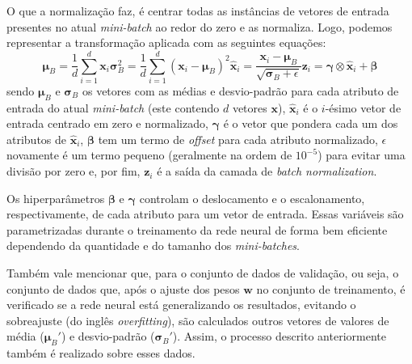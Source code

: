 \documentclass[a4paper, 12pt]{article}
\begin{document}
O que a normalização faz, é centrar todas as instâncias de vetores de entrada presentes no atual \textit{mini-batch} ao redor do zero e as normaliza. Logo, podemos representar a transformação aplicada com as seguintes equações:
\begin{subequations}
\begin{equation}\label{eq:bn-1}
 \boldsymbol{\mu}_{B} = \frac{1}{d} \sum_{i=1}^{d} \mathbf{x}_{i} 
\end{equation}
\begin{equation}\label{eq:bn-2}
\boldsymbol{\sigma}_{B}^{2} = \frac{1}{d} \sum_{i=1}^{d} (\mathbf{x}_{i} - \boldsymbol{\mu}_{B})^2 
\end{equation}
\begin{equation}\label{eq:bn-3}
\hat{\mathbf{x}}_{i} = \frac{\mathbf{x}_{i} - \boldsymbol{\mu}_{B}}{\sqrt{\boldsymbol{\sigma}_{B} + \epsilon}}
\end{equation}
\begin{equation}\label{eq:bn-4}
\mathbf{z}_{i} = \boldsymbol{\gamma} \otimes \hat{\mathbf{x}}_{i} + \boldsymbol{\beta}
\end{equation}
\end{subequations}
sendo $\boldsymbol{\mu}_{B}$ e $\boldsymbol{\sigma}_{B}$ os vetores com as médias e desvio-padrão para cada atributo de entrada do atual \textit{mini-batch} (este contendo $d$ vetores $\mathbf{x}$), $\hat{\mathbf{x}}_{i}$ é o $i$-ésimo vetor de entrada centrado em zero e normalizado, $\boldsymbol{\gamma}$ é o vetor que pondera cada um dos atributos de $\hat{\mathbf{x}}_{i}$, $\boldsymbol{\beta}$ tem um termo de \textit{offset} para cada atributo normalizado, $\epsilon$ novamente é um termo pequeno (geralmente na ordem de $10^{-5}$) para evitar uma divisão por zero e, por fim, $\mathbf{z}_{i}$ é a saída da camada de \textit{batch normalization}.

Os hiperparâmetros $\boldsymbol{\beta}$ e $\boldsymbol{\gamma}$ controlam o deslocamento e o escalonamento, respectivamente, de cada atributo para um vetor de entrada. Essas variáveis são parametrizadas durante o treinamento da rede neural de forma bem eficiente dependendo da quantidade e do tamanho dos \textit{mini-batches}. 

Também vale mencionar que, para o conjunto de dados de validação, ou seja, o conjunto de dados que, após o ajuste dos pesos $\mathbf{w}$ no conjunto de treinamento, é verificado se a rede neural está generalizando os resultados, evitando o sobreajuste (do inglês \textit{overfitting}), são calculados outros vetores de valores de média ($\boldsymbol{\mu}_{B}'$) e desvio-padrão ($\boldsymbol{\sigma}_{B}'$). Assim, o processo descrito anteriormente também é realizado sobre esses dados.
\end{document}
